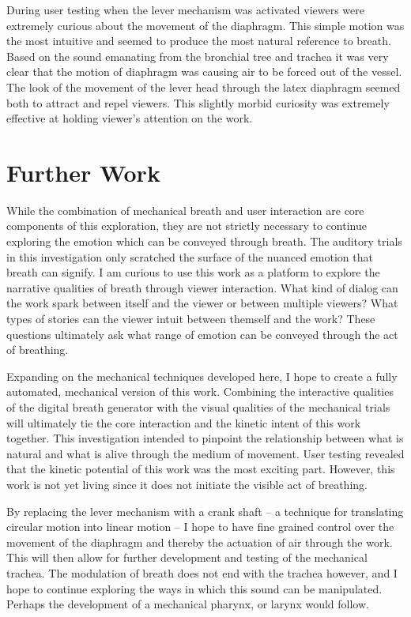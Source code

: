 \documentclass[letterpaper]{article}
\begin{document}
During user testing when the lever mechanism was activated viewers were extremely curious about the movement of the diaphragm. This simple motion was the most intuitive and seemed to produce the most natural reference to breath. Based on the sound emanating from the bronchial tree and trachea it was very clear that the motion of diaphragm was causing air to be forced out of the vessel. The look of the movement of the lever head through the latex diaphragm seemed both to attract and repel viewers. This slightly morbid curiosity was extremely effective at holding viewer's attention on the work.  

\section{Further Work}



While the combination of mechanical breath and user interaction are core components of this exploration, they are not strictly necessary to continue exploring the emotion which can be conveyed through breath. The auditory trials in this investigation only scratched the surface of the nuanced emotion that breath can signify. I am curious to use this work as a platform to explore the narrative qualities of breath through viewer interaction. What kind of dialog can the work spark between itself and the viewer or between multiple viewers? What types of stories can the viewer intuit between themself and the work? These questions ultimately ask what range of emotion can be conveyed through the act of breathing.

Expanding on the mechanical techniques developed here, I hope to create a fully automated, mechanical version of this work. Combining the interactive qualities of the digital breath generator with the visual qualities of the mechanical trials will ultimately tie the core interaction and the kinetic intent of this work together. This investigation intended to pinpoint the relationship between what is natural and what is alive through the medium of movement. User testing revealed that the kinetic potential of this work was the most exciting part. However, this work is not yet living since it does not initiate the visible act of breathing.

By replacing the lever mechanism with a crank shaft -- a technique for translating circular motion into linear motion -- I hope to have fine grained control over the movement of the diaphragm and thereby the actuation of air through the work. This will then allow for further development and testing of the mechanical trachea. The modulation of breath does not end with the trachea however, and I hope to continue exploring the ways in which this sound can be manipulated. Perhaps the development of a mechanical pharynx, or larynx would follow. 
\end{document}
